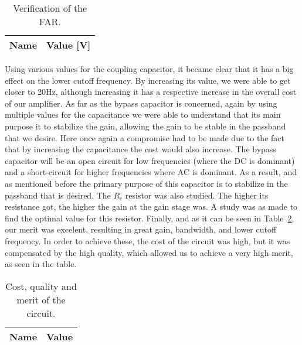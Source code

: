 \begin{table}[H]
 \centering
 \begin{tabular}{|l|r|}
 \hline
 {\bf Name} & {\bf Value [V]} \\ \hline

 \end{tabular}
 \caption{Verification of the FAR.}
 \label{tab:forwardbias}
 \end{table}

Using various values for the coupling capacitor, it became clear that it has a big
effect on the lower cutoff frequency. By increasing its value, we were able to get
closer to 20Hz, although increasing it has a respective increase in the overall
cost of our amplifier.
As far as the bypass capacitor is concerned, again by using multiple values for
the capacitance we were able to understand that its main purpose it to stabilize
the gain, allowing the gain to be stable in the passband that we desire. Here once
again a compromise had to be made due to the fact that by increasing the
capacitance the cost would also increase.
The bypass capacitor will be an open circuit for low frequencies (where the DC is
dominant) and a short-circuit for higher frequencies where AC is dominant. As a
result, and as mentioned before the primary purpose of this capacitor is to
stabilize in the passband that is desired.
The $R_c$ resistor was also studied. The higher its resistance got, the higher the
gain at the gain stage was. A study was as made to find the
optimal value for this resistor.
Finally, and as it can be seen in Table~\ref{tab:merit_spice}, our merit was excelent, resulting in great gain, bandwidth, and lower cutoff frequency. In order to achieve these, the cost of the circuit was high, but it was compensated by the high quality, which allowed us to achieve a very high merit, as seen in the table. 

\begin{table}[H]
 \centering
 \begin{tabular}{|l|r|}
 \hline
 {\bf Name} & {\bf Value} \\ \hline

 \end{tabular}
 \caption{Cost, quality and merit of the circuit.}
 \label{tab:merit_spice}
\end{table}
